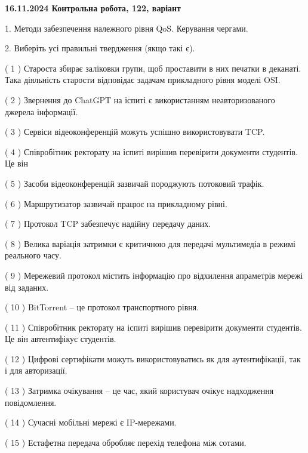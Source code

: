 \documentclass[12pt, ukrainian]{article}
\begin{document}
\vspace{4mm}
\newpage
\begin {large}

\textbf{16.11.2024 Контрольна робота, 122, варіант  }\par


{
1. Методи забезпечення належного рівня QoS. Керування чергами.



\vspace{5mm}
2. Виберіть усі правильні твердження (якщо такі є).\par
\vspace{2mm}

( 1 ) Староста збирає заліковки групи, щоб проставити в них печатки в деканаті. Така діяльність старости відповідає задачам прикладного рівня моделі OSI.

( 2 ) Звернення до ChatGPT на іспиті є використанням неавторизованого джерела інформації.

( 3 ) Сервіси відеоконференцій можуть успішно використовувати TCP.

( 4 ) Співробітник ректорату на іспиті вирішив перевірити документи студентів. Це він

( 5 ) Засоби відеоконференцій зазвичай породжують потоковий трафік.

( 6 ) Маршрутизатор зазвичай працює на прикладному рівні.

( 7 ) Протокол TCP забезпечує надійну передачу даних.

( 8 ) Велика варіація затримки є критичною для передачі мультимедіа в режимі реального часу.

( 9 ) Мережевий протокол містить інформацію про відхилення апраметрів мережі від заданих.

( 10 ) BitTorrent – це протокол транспортного рівня.

( 11 ) Співробітник ректорату на іспиті вирішив перевірити документи студентів. Це він автентифікує студентів.

( 12 ) Цифрові сертифікати можуть використовуватись як для аутентифікації, так і для авторизації.

( 13 ) Затримка очікування – це час, який користувач очікує надходження повідомлення.

( 14 ) Сучасні мобільні мережі є IP-мережами.

( 15 ) Естафетна передача обробляє перехід телефона між сотами.
}
\end {large}
\end{document}
